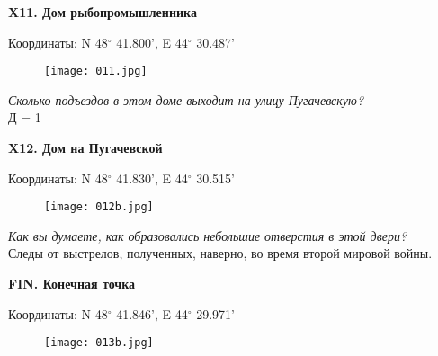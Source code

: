 \documentclass[pscyr,titlepage]{hedreport}
\begin{document}
  \pagebreak

  \textbf{X11. Дом рыбопромышленника}

  Координаты: N 48\( ^\circ \) 41.800', E 44\( ^\circ \) 30.487'

  \begin{figure}[htbp]
    \center
    \texttt{[image: 011.jpg]}
  \end{figure}

  \emph{Сколько подъездов в этом доме выходит на улицу Пугачевскую?} \\
  Д = 1

  \pagebreak

  \textbf{X12. Дом на Пугачевской}

  Координаты: N 48\( ^\circ \) 41.830', E 44\( ^\circ \) 30.515'

  \begin{figure}[htbp]
    \center
    \texttt{[image: 012b.jpg]}
  \end{figure}
  
  \emph{Как вы думаете, как образовались небольшие отверстия в этой двери?} \\
  Следы от выстрелов, полученных, наверно, во время второй мировой войны.
  \pagebreak

  \textbf{FIN. Конечная точка}

  Координаты: N 48\( ^\circ \) 41.846', E 44\( ^\circ \) 29.971'

  \begin{figure}[htbp]
    \center
    \texttt{[image: 013b.jpg]}
  \end{figure}
  
  \pagebreak
  
\end{document}
